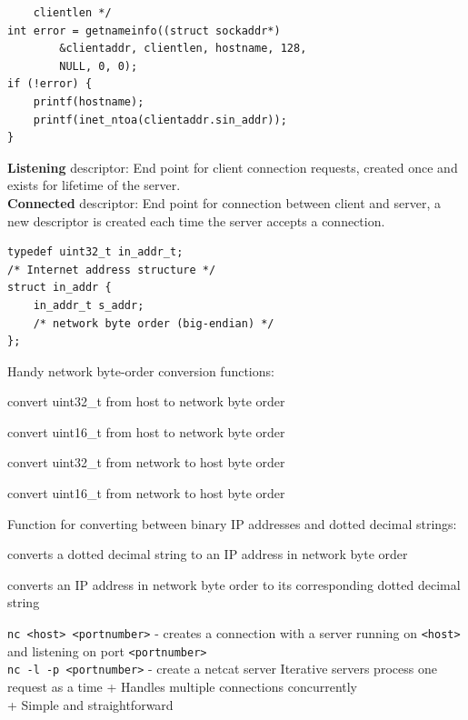 \documentclass[number]{notes}
\begin{document}
\begin{landscape}
\begin{multicols}{3}
\begin{lstlisting}
    clientlen */
int error = getnameinfo((struct sockaddr*)
        &clientaddr, clientlen, hostname, 128,
        NULL, 0, 0);
if (!error) {
    printf(hostname);
    printf(inet_ntoa(clientaddr.sin_addr));
}
\end{lstlisting}
\textbf{Listening} descriptor: End point for client connection requests, created once and exists for lifetime of the server.\\
\textbf{Connected} descriptor: End point for connection between client and server, a new descriptor is created each time the server accepts a connection.
\begin{lstlisting}
typedef uint32_t in_addr_t;
/* Internet address structure */
struct in_addr {
    in_addr_t s_addr;
    /* network byte order (big-endian) */
};
\end{lstlisting}
Handy network byte-order conversion functions:
\begin{description}[nolistsep]
    \item[htonl()] convert uint32\_t from host to network byte order
    \item[htons()] convert uint16\_t from host to network byte order
    \item[ntohl()] convert uint32\_t from network to host byte order
    \item[ntohs()] convert uint16\_t from network to host byte order
\end{description}
Function for converting between binary IP addresses and dotted decimal strings:
\begin{description}[nolistsep]
    \item[inet\_aton(...)] converts a dotted decimal string to an IP address in network byte order
    \item[inet\_ntoa(...)] converts an IP address in network byte order to its corresponding dotted decimal string
\end{description}
\texttt{nc <host> <portnumber>} - creates a connection with a server running on \texttt{<host>} and listening on port \texttt{<portnumber>}\\
\texttt{nc -l -p <portnumber>} - create a netcat server
Iterative servers process one request as a time
+ Handles multiple connections concurrently\\
+ Simple and straightforward\\

\end{multicols}
\end{landscape}
\end{document}
